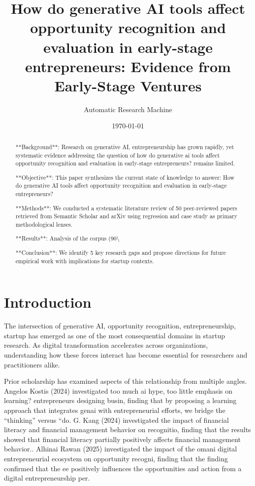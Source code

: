 \documentclass[11pt, a4paper]{article}
\title{How do generative AI tools affect opportunity recognition and evaluation in early-stage entrepreneurs: Evidence from Early-Stage Ventures}
\author{Automatic Research Machine}
\date{\today}
\begin{document}
\maketitle

\begin{abstract}
**Background**: Research on generative AI, entrepreneurship has grown rapidly, yet systematic evidence addressing the question of how do generative ai tools affect opportunity recognition and evaluation in early-stage entrepreneurs? remains limited.

**Objective**: This paper synthesizes the current state of knowledge to answer: How do generative AI tools affect opportunity recognition and evaluation in early-stage entrepreneurs?

**Methods**: We conducted a systematic literature review of 50 peer-reviewed papers retrieved from Semantic Scholar and arXiv using regression and case study as primary methodological lenses.

**Results**: Analysis of the corpus (90\textbackslash{}%

**Conclusion**: We identify 5 key research gaps and propose directions for future empirical work with implications for startup contexts.
\end{abstract}

\section{Introduction}
The intersection of generative AI, opportunity recognition, entrepreneurship, startup has emerged as one of the most consequential domains in startup research. As digital transformation accelerates across organizations, understanding how these forces interact has become essential for researchers and practitioners alike.

Prior scholarship has examined aspects of this relationship from multiple angles. Angelos Kostis (2024) investigated too much ai hype, too little emphasis on learning? entrepreneurs designing busin, finding that by proposing a learning approach that integrates genai with entrepreneurial efforts, we bridge the “thinking” versus “do. G. Kang (2024) investigated the impact of financial literacy and financial management behavior on recognitio, finding that the results showed that financial literacy partially positively affects financial management behavior.. Alhinai Rawan (2025) investigated the impact of the omani digital entrepreneurial ecosystem on opportunity recogni, finding that the finding confirmed that the ee positively influences the opportunities and action from a digital entrepreneurship per. 
\end{document}
